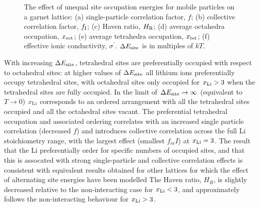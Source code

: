 \documentclass[aps,prb,twocolumn,superscriptaddress,reprint]{revtex4-1}
\newcommand{\xLi}{x_\m{Li}}
\begin{document}
\begin{figure}[tb]
  \centering
    \caption{\label{fig:site_energies_data}The effect of unequal site occupation energies for mobile particles on a garnet lattice: (a) single-particle correlation factor, $f$; (b) collective correlation factor, $f_{\mathrm{I}}$; (c) Haven ratio, $H_{\mathrm{R}}$; (d) average octahedra occupation, $x_{\mathrm{oct}}$; (e) average tetrahedra occupation, $x_{\mathrm{tet}}$; (f) effective ionic conductivity, $\sigma^\prime$. $\Delta E_{\mathrm{site}}$ is in multiples of $kT$.}
\end{figure}

With increasing $\Delta E_{\mathrm{site}}$, tetrahedral sites are preferentially occupied with respect to octahedral sites: at higher values of $\Delta E_{\mathrm{site}}$ all lithium ions preferentially occupy tetrahedral sites, with octahedral sites only occupied for $\xLi>3$ when the tetrahedral sites are fully occupied. 
In the limit of $\Delta E_{\mathrm{site}}\to\infty$ (equivalent to $T\to0$) $\xLi$ corresponds to an ordered arrangement with all the tetrahedral sites occupied and all the octahedral sites vacant. 
The preferential tetrahedral occupation and associated ordering correlates with an increased single particle correlation (decreased $f$) and introduces collective correlation across the full Li stoichiometry range, with the largest effect (smallest $f_m{I}$) at $\xLi=3$. 
The result that the Li preferentially order for specific numbers of occupied sites, and that this is assocated with strong single-particle and collective correlation effects is consistent with equivalent results obtained for other lattices for which the effect of alternating site energies have been modelled  The Haven ratio, $H_R$, is slightly decreased relative to the non-interacting case for $\xLi<3$, and approximately follows the non-interacting behaviour for $\xLi>3$.
\end{document}
